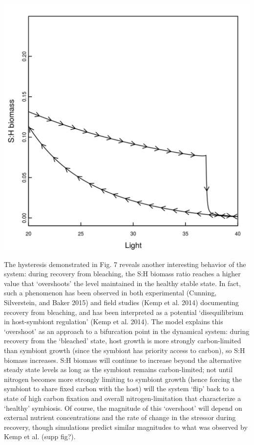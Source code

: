 \documentclass[]{elsarticle} %
\makeatletter
\def\maxwidth{\ifdim\Gin@nat@width>\linewidth\linewidth
\else\Gin@nat@width\fi}
\let\Oldincludegraphics\includegraphics
\renewcommand{\includegraphics}[1]{\Oldincludegraphics[width=\maxwidth]{#1}}
\makeatother
\begin{document}
\includegraphics{../img/Fig7.png}

The hysteresis demonstrated in Fig. 7 reveals another interesting
behavior of the system: during recovery from bleaching, the S:H biomass
ratio reaches a higher value that `overshoots' the level maintained in
the healthy stable state. In fact, such a phenomenon has been observed
in both experimental (Cunning, Silverstein, and Baker 2015) and field
studies (Kemp et al. 2014) documenting recovery from bleaching, and has
been interpreted as a potential `disequilibrium in host-symbiont
regulation' (Kemp et al. 2014). The model explains this `overshoot' as
an approach to a bifurcation point in the dynamical system: during
recovery from the `bleached' state, host growth is more strongly
carbon-limited than symbiont growth (since the symbiont has priority
access to carbon), so S:H biomass increases. S:H biomass will continue
to increase beyond the alternative steady state levels as long as the
symbiont remains carbon-limited; not until nitrogen becomes more
strongly limiting to symbiont growth (hence forcing the symbiont to
share fixed carbon with the host) will the system `flip' back to a state
of high carbon fixation and overall nitrogen-limitation that
characterize a `healthy' symbiosis. Of course, the magnitude of this
`overshoot' will depend on external nutrient concentrations and the rate
of change in the stressor during recovery, though simulations predict
similar magnitudes to what was observed by Kemp et al. (supp fig?).
\end{document}
